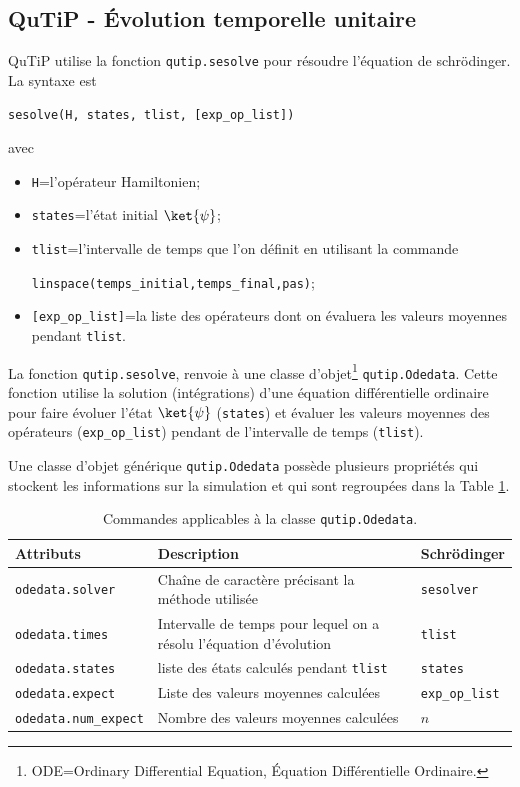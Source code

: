 \subsection{QuTiP - Évolution temporelle unitaire}

QuTiP utilise la fonction \texttt{qutip.sesolve} pour résoudre l'équation de 
schr\"odinger. La syntaxe est
\begin{center}
 \texttt{sesolve(H, states, tlist, [exp\_op\_list])}
\end{center}
avec
\begin{itemize}
\item \texttt{H}=l'opérateur Hamiltonien;
\item \texttt{states}=l'état initial $\ket{\psi}$;
\item \texttt{tlist}=l'intervalle de temps que l'on définit en utilisant la
commande 
\begin{center}
\texttt{linspace(temps\_initial,temps\_final,pas)};
\end{center}
\item \texttt{[exp\_op\_list]}=la liste des opérateurs dont on évaluera les 
valeurs moyennes pendant \texttt{tlist}.
\end{itemize}

La fonction \texttt{qutip.sesolve}, renvoie à une classe 
d'objet\footnote{ODE=Ordinary Differential Equation, Équation Différentielle 
Ordinaire.} \texttt{qutip.Odedata}. Cette fonction utilise la solution 
(intégrations) d'une équation différentielle ordinaire pour faire évoluer 
l'état $\ket{\psi}$ (\texttt{states}) et évaluer les valeurs moyennes 
des opérateurs (\texttt{exp\_op\_list}) pendant de l'intervalle de temps 
(\texttt{tlist}).

Une classe d'objet générique \texttt{qutip.Odedata} possède plusieurs 
propriétés 
qui stockent les informations sur la simulation et qui sont regroupées dans la 
Table \ref{tab:Odedata}.

\begin{table}[htp]
\centering
\begin{tabular}{|l|p{7cm}|l|} \hline \hline
\textbf{Attributs} & \textbf{Description} & \textbf{Schrödinger}\\ \hline \hline
\texttt{odedata.solver} & Chaîne de caractère précisant la méthode utilisée & 
\texttt{sesolver}\\ \hline
\texttt{odedata.times} & Intervalle de temps pour lequel on a résolu 
l'équation d'évolution & \texttt{tlist}\\ \hline
\texttt{odedata.states} & liste des états calculés pendant \texttt{tlist} & 
\texttt{states} \\ \hline
\texttt{odedata.expect} & Liste des valeurs moyennes calculées & 
\texttt{exp\_op\_list} \\ \hline
\texttt{odedata.num\_expect} & Nombre des valeurs moyennes calculées & $n$ \\ 
\hline
\end{tabular}
\caption{Commandes applicables à la classe \texttt{qutip.Odedata}.}
\label{tab:Odedata}
\end{table}

